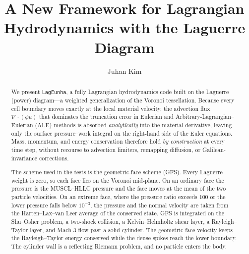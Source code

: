 \documentclass[twocolumn]{aastex63}
\newcommand{\lageunha}{\texttt{LagEunha}}
\newcommand{\vel}{{u}}
\begin{document}
\title{A New Framework for Lagrangian Hydrodynamics with the Laguerre Diagram}
\author[0000-0002-4391-2275]{Juhan Kim}




\begin{abstract}
We present \lageunha, a fully Lagrangian hydrodynamics code built
on the Laguerre (power) diagram---a weighted generalization of the
Voronoi tessellation.
Because every cell boundary moves exactly at the local material
velocity, the advection flux $\nabla\!\cdot\!(\phi\vel)$ that
dominates the truncation error in Eulerian and
Arbitrary-Lagrangian--Eulerian (ALE) methods is absorbed
\emph{analytically} into the material derivative, leaving only the
surface pressure--work integral on the right-hand side of the
Euler equations.
Mass, momentum, and energy conservation therefore hold
\emph{by construction} at every time step, without recourse to
advection limiters, remapping diffusion, or Galilean-invariance
corrections.

The scheme used in the tests is the geometric-face scheme (GFS).
Every Laguerre weight is zero, so each face lies on the Voronoi mid-plane.
On an ordinary face the pressure is the MUSCL--HLLC pressure and the face moves at the mean of the two particle velocities.
On an extreme face, where the pressure ratio exceeds $100$ or the lower pressure falls below $10^{-3}$, the pressure and the normal velocity are taken from the Harten--Lax--van Leer average of the conserved state.
GFS is integrated on the Shu--Osher problem, a two-shock collision, a Kelvin--Helmholtz shear layer, a Rayleigh--Taylor layer, and Mach 3 flow past a solid cylinder.
The geometric face velocity keeps the Rayleigh--Taylor energy conserved while the dense spikes reach the lower boundary.
The cylinder wall is a reflecting Riemann problem, and no particle enters the body.
\end{abstract}


\end{document}
